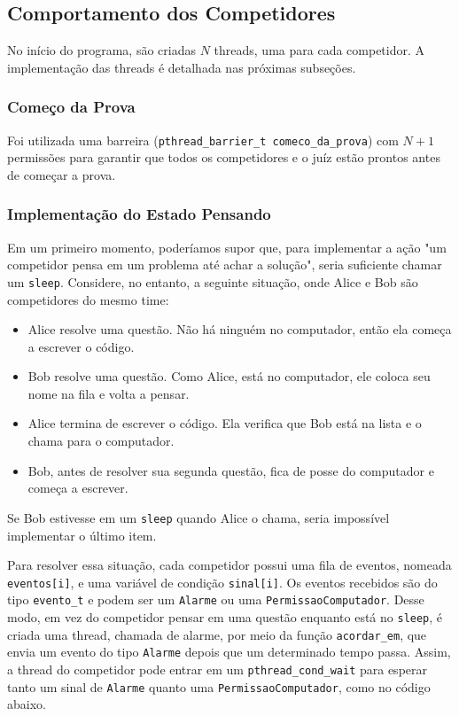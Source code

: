 \documentclass[11pt]{article}
\newcommand{\code}{\lstinline[mathescape=true]}
\begin{document}
\subsection{Comportamento dos Competidores}
No início do programa, são criadas $N$ threads, uma para cada competidor. A implementação das threads é
detalhada nas próximas subseções.

\subsubsection{Começo da Prova}
Foi utilizada uma barreira (\code{pthread_barrier_t comeco_da_prova}) com $N + 1$ permissões para garantir que todos os competidores e o juíz
estão prontos antes de começar a prova.

\subsubsection{Implementação do Estado Pensando}
Em um primeiro momento, poderíamos supor que, para implementar a ação "um competidor pensa em um
problema até achar a solução", seria suficiente chamar um \code{sleep}. Considere, no entanto, a
seguinte situação, onde Alice e Bob são competidores do mesmo time:

\begin{itemize}
	\item Alice resolve uma questão. Não há ninguém no computador, então ela começa a escrever o
		código.
	\item Bob resolve uma questão. Como Alice, está no computador, ele coloca seu nome na fila e
		volta a pensar.
	\item Alice termina de escrever o código. Ela verifica que Bob está na lista e o chama para o
		computador.
	\item Bob, antes de resolver sua segunda questão, fica de posse do computador e começa a
		escrever.
\end{itemize}

Se Bob estivesse em um \code{sleep} quando Alice o chama, seria impossível implementar o último item.

Para resolver essa situação, cada competidor possui uma fila de eventos, nomeada \code{eventos[i]}, e
uma variável de condição \code{sinal[i]}. Os eventos recebidos são do tipo \code{evento_t} e podem
ser um \code{Alarme} ou uma \code{PermissaoComputador}. Desse modo, em vez do competidor pensar em
uma questão enquanto está no \code{sleep}, é criada uma thread, chamada de alarme, por meio da função
\code{acordar_em}, que envia um evento do tipo \code{Alarme} depois que um determinado tempo passa.
Assim, a thread do competidor pode entrar em um \code{pthread_cond_wait} para esperar tanto um sinal
de \code{Alarme} quanto uma \code{PermissaoComputador}, como no código abaixo.
\end{document}
